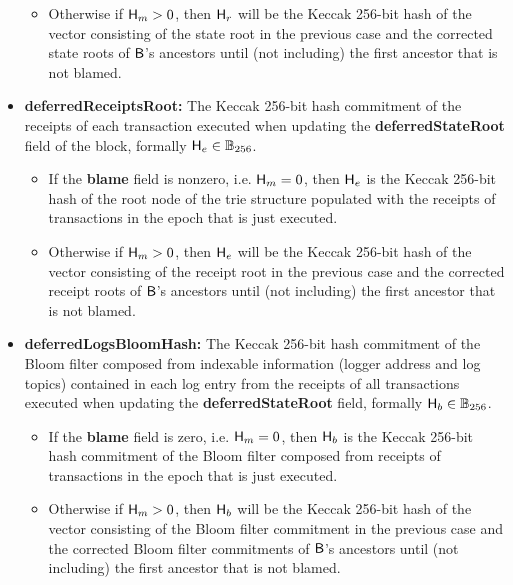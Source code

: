 \begin{itemize}[nosep]
\begin{itemize}
		\item Otherwise if $\textsf{H}_m>0$, then $\textsf{H}_r$ will be the Keccak 256-bit hash of the vector consisting of the state root in the previous case and the corrected state roots of $\textsf{B}$'s ancestors until (not including) the first ancestor that is not blamed.
	\end{itemize}
	
	

	\item {\bf deferredReceiptsRoot:} The Keccak 256-bit hash commitment of the receipts of each transaction executed when updating the {\bf deferredStateRoot} field of the block, formally $\textsf{H}_e\in\mathbb{B}_{256}$. 
	\begin{itemize}
		\item If the {\bf blame} field is nonzero, i.e. $\textsf{H}_m=0$, then $\textsf{H}_e$ is the Keccak 256-bit hash of the root node of the trie structure populated with the receipts of transactions in the epoch that is just executed.
		
		\item Otherwise if $\textsf{H}_m>0$, then $\textsf{H}_e$ will be the Keccak 256-bit hash of the vector consisting of the receipt root in the previous case and the corrected receipt roots of $\textsf{B}$'s ancestors until (not including) the first ancestor that is not blamed.
	\end{itemize}
	
	 


	\item {\bf deferredLogsBloomHash:} The Keccak 256-bit hash commitment of the Bloom filter composed from indexable information (logger address and log topics) contained in each log entry from the receipts of all transactions executed when updating the {\bf deferredStateRoot} field, formally $\textsf{H}_b\in\mathbb{B}_{256}$.
	\begin{itemize}
		\item If the {\bf blame} field is zero, i.e. $\textsf{H}_m=0$, then $\textsf{H}_b$ is the Keccak 256-bit hash commitment of the Bloom filter composed from receipts of transactions in the epoch that is just executed.
	
		\item Otherwise if $\textsf{H}_m>0$, then $\textsf{H}_b$ will be the Keccak 256-bit hash of the vector consisting of the Bloom filter commitment in the previous case and the corrected Bloom filter commitments of $\textsf{B}$'s ancestors until (not including) the first ancestor that is not blamed.
	\end{itemize}


\end{itemize}
